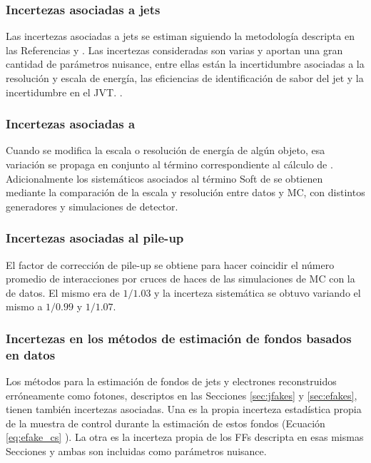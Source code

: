 \subsubsection{Incertezas asociadas a jets}

Las incertezas asociadas a jets se estiman siguiendo la metodología descripta en las Referencias \cite{PERF-2011-03} y \cite{ATLAS-CONF-2015-037}. Las incertezas consideradas son varias y aportan una gran cantidad de parámetros nuisance, entre ellas están la incertidumbre asociadas a la resolución y escala de energía, las eficiencias de identificación de sabor del jet y la incertidumbre en el JVT. .

\subsubsection{Incertezas asociadas a \met}

Cuando se modifica la escala o resolución de energía de algún objeto, esa variación se propaga en conjunto al término correspondiente al cálculo de \met. Adicionalmente los sistemáticos asociados al término Soft de \met se obtienen mediante la comparación de la escala y resolución entre datos y MC, con distintos generadores y simulaciones de detector.

\subsubsection{Incertezas asociadas al pile-up}

El factor de corrección de pile-up se obtiene para hacer coincidir el número promedio de interacciones por cruces de haces de las simulaciones de MC con la de datos. El mismo era de $1/1.03$ y  la incerteza sistemática se obtuvo variando el mismo a $1/0.99$ y $1/1.07$. 

\subsubsection{Incertezas en los métodos de estimación de fondos basados en datos}

Los métodos para la estimación de fondos de jets y electrones reconstruidos erróneamente como fotones, descriptos en las Secciones \ref{sec:jfakes} y \ref{sec:efakes}, tienen también incertezas asociadas. Una es la propia incerteza estadística propia de la muestra de control durante la estimación de estos fondos (Ecuación \ref{eq:efake_cs} ). La otra es la incerteza propia de los FFs descripta en esas mismas Secciones y ambas son incluidas como parámetros nuisance.



